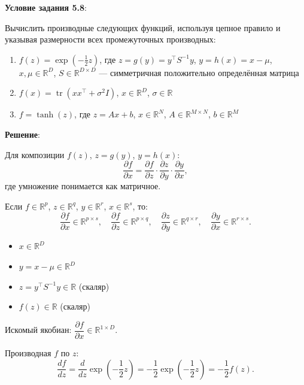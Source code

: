 \documentclass[pract]{SCWorks}
\begin{document}
    \textbf{Условие задания 5.8}:

    Вычислить производные следующих функций, используя цепное правило и указывая размерности всех промежуточных производных:
    \begin{enumerate}[label=\alph*)]
        \item $f(z) = \exp\left(-\frac{1}{2}z\right)$, где $z = g(y) = y^\top S^{-1}y$, $y = h(x) = x - \mu$,
              $x, \mu \in \mathbb{R}^D$, $S \in \mathbb{R}^{D \times D}$ — симметричная положительно определённая матрица

        \item $f(x) = \operatorname{tr}(xx^\top + \sigma^2 I)$, $x \in \mathbb{R}^D$, $\sigma \in \mathbb{R}$

        \item $f = \tanh(z)$, где $z = Ax + b$, $x \in \mathbb{R}^N$, $A \in \mathbb{R}^{M \times N}$, $b \in \mathbb{R}^M$
    \end{enumerate}

    \textbf{Решение}:

    Для композиции $f(z)$, $z = g(y)$, $y = h(x)$:
    \[
    \frac{\partial f}{\partial x} = \frac{\partial f}{\partial z} \cdot \frac{\partial z}{\partial y} \cdot \frac{\partial y}{\partial x},
    \]
    где умножение понимается как матричное.

    Если $f \in \mathbb{R}^p$, $z \in \mathbb{R}^q$, $y \in \mathbb{R}^r$, $x \in \mathbb{R}^s$, то:
    \[
    \frac{\partial f}{\partial x} \in \mathbb{R}^{p \times s}, \quad
    \frac{\partial f}{\partial z} \in \mathbb{R}^{p \times q}, \quad
    \frac{\partial z}{\partial y} \in \mathbb{R}^{q \times r}, \quad
    \frac{\partial y}{\partial x} \in \mathbb{R}^{r \times s}.
    \]

    \begin{itemize}
        \item[$\bullet$] $x \in \mathbb{R}^D$
        \item[$\bullet$] $y = x - \mu \in \mathbb{R}^D$
        \item[$\bullet$] $z = y^\top S^{-1}y \in \mathbb{R}$ (скаляр)
        \item[$\bullet$] $f(z) \in \mathbb{R}$ (скаляр)
    \end{itemize}

    Искомый якобиан: $\dfrac{\partial f}{\partial x} \in \mathbb{R}^{1 \times D}$.

    Производная $f$ по $z$:
    \[
    \frac{df}{dz} = \frac{d}{dz} \exp\left(-\frac{1}{2}z\right) = -\frac{1}{2} \exp\left(-\frac{1}{2}z\right) = -\frac{1}{2} f(z).
    \]
\end{document}
